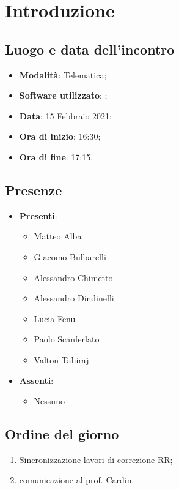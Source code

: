 \documentclass[]{article}
\begin{document}
	
	
	
	\newpage
	
	
		\section{Introduzione}
		\subsection{Luogo e data dell'incontro}
		\begin{itemize}
			\item \textbf{Modalità}: Telematica;
			\item \textbf{Software utilizzato}: ;
			\item \textbf{Data}: 15 Febbraio 2021;
			\item \textbf{Ora di inizio}: 16:30;
			\item \textbf{Ora di fine}: 17:15.
		\end{itemize}

		\subsection{Presenze}
		\begin{itemize}
			\item \textbf{Presenti}:
			\begin{itemize}
				\item Matteo Alba
				\item Giacomo Bulbarelli
				\item Alessandro Chimetto
				\item Alessandro Dindinelli
				\item Lucia Fenu
				\item Paolo Scanferlato
				\item Valton Tahiraj
			\end{itemize}
			\item \textbf{Assenti}:
			\begin{itemize}
				\item Nessuno
			\end{itemize}
		\end{itemize}


		\subsection{Ordine del giorno}
		\begin{enumerate}
			\item Sincronizzazione lavori di correzione RR;
			\item comunicazione al prof. Cardin.
		\end{enumerate}
\end{document}
